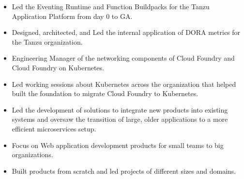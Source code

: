 \documentclass[10pt,a4paper,ragged2e,withhyper]{altacv}
\begin{document}
\begin{paracol}{2}


\begin{itemize}
    \item Led the Eventing Runtime and Function Buildpacks for the Tanzu Application Platform from day 0 to GA.
    \item Designed, architected, and Led the internal application of DORA metrics for the Tanzu organization.
\end{itemize}
\divider

\begin{itemize}
    \item Engineering Manager of the networking components of Cloud Foundry and Cloud Foundry on Kubernetes.
    \item Led working sessions about Kubernetes across the organization that helped built the foundation to migrate Cloud Foundry to Kubernetes.
\end{itemize}

\divider

\begin{itemize}
    \item Led the development of solutions to integrate new products into existing systems and oversaw the transition of large, older applications to a more efficient microservices setup.
\end{itemize}

\divider

\begin{itemize}
    \item Focus on Web application development products for small teams to big organizations.
    \item Built products from scratch and led projects of different sizes and domains.
\end{itemize}

\medskip


\switchcolumn


\end{paracol}
\end{document}
